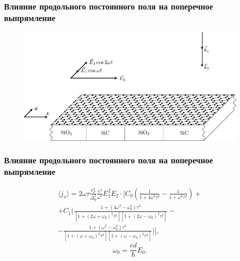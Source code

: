 \documentclass[10pt,pdf,intlimits]{beamer}
\begin{document}
    \begin{frame}
    \frametitle{Влияние продольного постоянного поля на поперечное выпрямление}
        \begin{figure}[h]
          \center
          \includegraphics[height=.6\textheight]{../figures/graphene2.pdf}
      \end{figure}
  \end{frame}
  \begin{frame}
    \frametitle{Влияние продольного постоянного поля на поперечное выпрямление}
\begin{gather}
    \langle j_x \rangle = 2\omega\tau
    \frac{v_F^3}{\Delta_g^3}\frac{e^3}{\omega^3}E_1^2 E_2
    \cdot\Bigg[
        C_0\left(
            \frac{1}{1+4\omega^2\tau^2} -
            \frac{1}{1+\omega^2\tau^2}
            \right) + \nonumber \\+
        C_1\Bigg(
            \frac{1+(4\omega^2-\omega_0^2)\tau^2}
            {[1+(2\omega+\omega_0)^2\tau^2][1+(2\omega-\omega_0)^2\tau^2]}-\\-
            \frac{1+(\omega^2-\omega_0^2)\tau^2}
            {[1+(\omega+\omega_0)^2\tau^2][1+(\omega-\omega_0)^2\tau^2]}
            \Bigg)
    \Bigg], \nonumber
\end{gather}
\begin{equation}
  \omega_0 = \frac{ed}{\hbar}E_0.
\end{equation}
  \end{frame}
\end{document}
